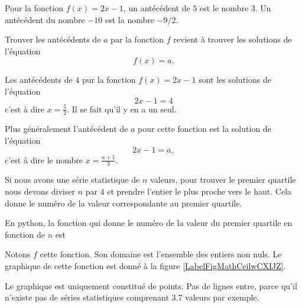 \begin{example}
    Pour la fonction \( f(x)=2x-1\), un antécédent de \( 5\) est le nombre \( 3\). Un antécédent du nombre \( -10\) est la nombre \( -9/2\).
\end{example}

\begin{Aretenir}
    Trouver les antécédents de \( a\) par la fonction \( f\) revient à trouver les solutions de l'équation
    \begin{equation}
        f(x)=a.
    \end{equation}
\end{Aretenir}


\begin{example}

    Les antécédents de \( 4\) pur la fonction \( f(x)=2x-1\) sont les solutions de l'équation
    \begin{equation}
        2x-1=4
    \end{equation}
    c'est à dire \( x=\frac{ 5 }{2}\). Il se fait qu'il y en a un seul.

    Plus généralement l'antécédent de \( a\) pour cette fonction est la solution de l'équation
    \begin{equation}
        2x-1=a,
    \end{equation}
    c'est à dire le nombre \( x=\frac{ a+1 }{ 2 }\).
\end{example}

\begin{example} \label{EqlaIGDz}
    Si nous avons une série statistique de \( n\) valeurs, pour trouver le premier quartile nous devons diviser \( n\) par \( 4\) et prendre l'entier le plus proche vers le haut. Cela donne le numéro de la valeur correspondante au premier quartile.

    En python, la fonction qui donne le numéro de la valeur du premier quartile en fonction de \( n\) est
    \begin{quote}
    \end{quote}
    Notons \( f\) cette fonction. Son domaine est l'ensemble des entiers non nuls. Le graphique de cette fonction est donné à la figure \ref{LabelFigMathCeilwCXIJZ}.
\newcommand{\CaptionFigMathCeilwCXIJZ}{Le numéro de la valeur du premier quartile en fonction du nombre de valeurs.}


    Le graphique est uniquement constitué de points. Pas de lignes entre, parce qu'il n'existe pas de séries statistiques comprenant \( 3.7\) valeurs par exemple. 
\end{example}

